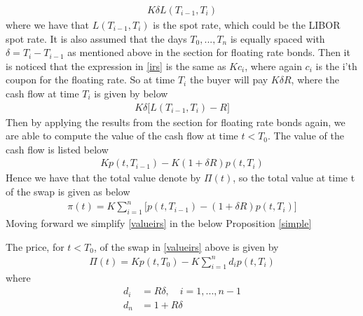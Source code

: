 \begin{align}
    K \delta L(T_{i-1},T_i)
    \label{irs}
\end{align}
where we have that $L(T_{i-1},T_i)$ is the spot rate, which could be the LIBOR spot rate.
It is also assumed
that the days $T_0,...,T_n$ is equally spaced with $\delta = T_i - T_{i-1}$ as mentioned above in the section for floating rate bonds. 
Then it is noticed that the expression in \autoref{irs} is the same as $Kc_i$, where again $c_i$ is the i'th coupon for the floating rate. 
So at time $T_i$ the buyer will pay $K \delta R$, where the cash flow at time $T_i$ is given by below
\begin{align*}
    K \delta \Big[L(T_{i-1},T_i)-R \Big]
\end{align*}
Then by applying the results from the section for floating rate bonds again, we are able to compute the value of the 
cash flow at time $t<T_0$. The value of the cash flow is listed below
\begin{align*}
    K p(t,T_{i-1})-K(1+\delta R)p(t,T_i)
\end{align*}
Hence we have that the total value denote by $\Pi(t)$, so the total value at time t of the swap is given as below
\begin{align}
    \pi (t) = K \sum_{i=1}^{n} \Big[p(t,T_{i-1})-(1+ \delta R)p(t,T_i)\Big]
    \label{valueirs}
\end{align}
Moving forward we simplify \autoref{valueirs} in the below Proposition \ref{simple} \cite{Bjork}
\begin{proposition}
    The price, for $t<T_0$, of the swap in \autoref{valueirs} above
    is given by 
    \begin{align*}
        \Pi(t) = K p(t,T_0)-K \sum_{i=1}^{n}d_i p(t,T_i)
    \end{align*}
    where
    \begin{align*}
        d_i &= R \delta, \quad i=1,...,n-1 \\
        d_n &= 1+ R \delta
    \end{align*}
    \label{simple}
\end{proposition}
\noindent 
